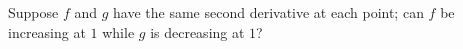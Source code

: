 Suppose $f$ and $g$ have the same second derivative at each point; can $f$ be increasing at $1$ while $g$ is decreasing at $1$?

